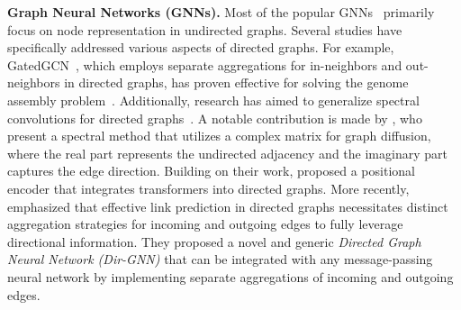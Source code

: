 \documentclass{article}
\begin{document}
\textbf{Graph Neural Networks (GNNs).} Most of the popular GNNs~\citep{kipf2016semi, hamilton2017inductive, velivckovic2017graph, ying2018graph} primarily focus on node representation in undirected graphs. Several studies have specifically addressed various aspects of directed graphs. For example, GatedGCN~\citep{li2015gated}, which employs separate aggregations for in-neighbors and out-neighbors in directed graphs, has proven effective for solving the genome assembly problem~\citep{vrvcek2022learning}. Additionally, research has aimed to generalize spectral convolutions for directed graphs~\cite{ma2019spectral, monti2018motifnet, tong2020directed, tong2020digraph}. A notable contribution is made by \citet{zhang2021magnet}, who present a spectral method that utilizes a complex matrix for graph diffusion, where the real part represents the undirected adjacency and the imaginary part captures the edge direction. Building on their work, \citet{geisler2023transformers} proposed a positional encoder that integrates transformers into directed graphs. More recently, \citet{rossi2024edge} emphasized that effective link prediction in directed graphs necessitates distinct aggregation strategies for incoming and outgoing edges to fully leverage directional information. They proposed a novel and generic \emph{Directed Graph Neural Network (Dir-GNN)} that can be integrated with any message-passing neural network by implementing separate aggregations of incoming and outgoing edges. 
\end{document}
